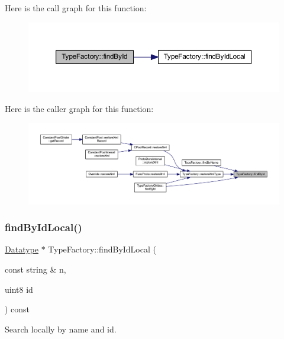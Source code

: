 Here is the call graph for this function\+:
\nopagebreak
\begin{figure}[H]
\begin{center}
\leavevmode
\includegraphics[width=350pt]{class_type_factory_a79cd8d76884043080a3430f3aff8b010_cgraph}
\end{center}
\end{figure}
Here is the caller graph for this function\+:
\nopagebreak
\begin{figure}[H]
\begin{center}
\leavevmode
\includegraphics[width=350pt]{class_type_factory_a79cd8d76884043080a3430f3aff8b010_icgraph}
\end{center}
\end{figure}
\mbox{\label{class_type_factory_ab86f43d69c0f879d315ce2aacc1f7326}} 
\subsubsection{\texorpdfstring{findByIdLocal()}{findByIdLocal()}}
{\footnotesize\ttfamily \mbox{\hyperlink{class_datatype}{Datatype}} $\ast$ Type\+Factory\+::find\+By\+Id\+Local (\begin{DoxyParamCaption}\item[{const string \&}]{n,  }\item[{uint8}]{id }\end{DoxyParamCaption}) const\hspace{0.3cm}{\ttfamily [protected]}}



Search locally by name and id. 

